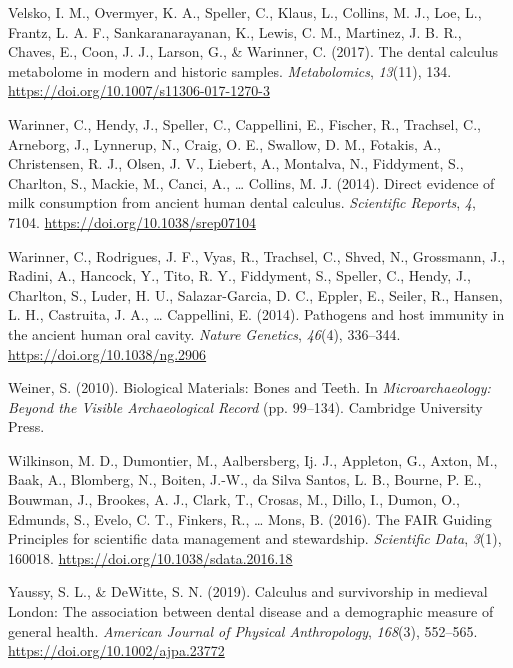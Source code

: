 \documentclass[
  b5paper,
]{book}
\newlength{\cslhangindent}
\newenvironment{CSLReferences}[2] %
 {\begin{list}{}{%
  \setlength{\itemindent}{0pt}
  \setlength{\leftmargin}{0pt}
  \setlength{\parsep}{0pt}
  \ifodd #1
   \setlength{\leftmargin}{\cslhangindent}
   \setlength{\itemindent}{-1\cslhangindent}
  \fi
  \setlength{\itemsep}{#2\baselineskip}}}
 {\end{list}}
\begin{document}
\begin{CSLReferences}{1}{0}
Velsko, I. M., Overmyer, K. A., Speller, C., Klaus, L., Collins, M. J.,
Loe, L., Frantz, L. A. F., Sankaranarayanan, K., Lewis, C. M., Martinez,
J. B. R., Chaves, E., Coon, J. J., Larson, G., \& Warinner, C. (2017).
The dental calculus metabolome in modern and historic samples.
\emph{Metabolomics}, \emph{13}(11), 134.
\url{https://doi.org/10.1007/s11306-017-1270-3}

Warinner, C., Hendy, J., Speller, C., Cappellini, E., Fischer, R.,
Trachsel, C., Arneborg, J., Lynnerup, N., Craig, O. E., Swallow, D. M.,
Fotakis, A., Christensen, R. J., Olsen, J. V., Liebert, A., Montalva,
N., Fiddyment, S., Charlton, S., Mackie, M., Canci, A., \ldots{}
Collins, M. J. (2014). Direct evidence of milk consumption from ancient
human dental calculus. \emph{Scientific Reports}, \emph{4}, 7104.
\url{https://doi.org/10.1038/srep07104}

Warinner, C., Rodrigues, J. F., Vyas, R., Trachsel, C., Shved, N.,
Grossmann, J., Radini, A., Hancock, Y., Tito, R. Y., Fiddyment, S.,
Speller, C., Hendy, J., Charlton, S., Luder, H. U., Salazar-Garcia, D.
C., Eppler, E., Seiler, R., Hansen, L. H., Castruita, J. A., \ldots{}
Cappellini, E. (2014). Pathogens and host immunity in the ancient human
oral cavity. \emph{Nature Genetics}, \emph{46}(4), 336--344.
\url{https://doi.org/10.1038/ng.2906}

Weiner, S. (2010). Biological {Materials}: {Bones} and {Teeth}. In
\emph{Microarchaeology: {Beyond} the {Visible Archaeological Record}}
(pp. 99--134). {Cambridge University Press}.

Wilkinson, M. D., Dumontier, M., Aalbersberg, Ij. J., Appleton, G.,
Axton, M., Baak, A., Blomberg, N., Boiten, J.-W., da Silva Santos, L.
B., Bourne, P. E., Bouwman, J., Brookes, A. J., Clark, T., Crosas, M.,
Dillo, I., Dumon, O., Edmunds, S., Evelo, C. T., Finkers, R., \ldots{}
Mons, B. (2016). The {FAIR Guiding Principles} for scientific data
management and stewardship. \emph{Scientific Data}, \emph{3}(1), 160018.
\url{https://doi.org/10.1038/sdata.2016.18}

Yaussy, S. L., \& DeWitte, S. N. (2019). Calculus and survivorship in
medieval {London}: {The} association between dental disease and a
demographic measure of general health. \emph{American Journal of
Physical Anthropology}, \emph{168}(3), 552--565.
\url{https://doi.org/10.1002/ajpa.23772}


\end{CSLReferences}
\end{document}
